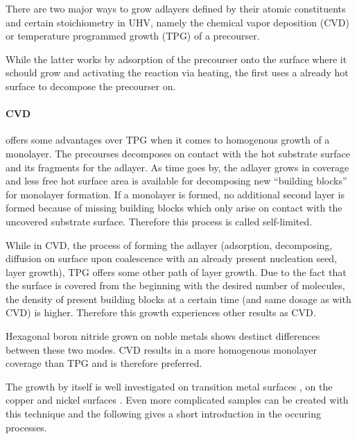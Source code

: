 There are two major ways to grow adlayers defined by their atomic constituents and certain stoichiometry in UHV, namely the chemical vapor deposition (CVD) or temperature programmed growth (TPG) of a precourser.

While the latter works by adsorption of the precourser onto the surface where it schould grow and activating the reaction via heating, the first uses a already hot surface to decompose the precourser on. 

\paragraph{CVD}offers some advantages over TPG when it comes to homogenous growth of a monolayer. The precourses decomposes on contact with the hot substrate surface and its fragments for the adlayer. As time goes by, the adlayer grows in coverage and less free hot surface area is available for decomposing new ``building blocks'' for monolayer formation. If a monolayer is formed, no additional second layer is formed because of missing building blocks which only arise on contact with the uncovered substrate surface. Therefore this process is called self-limited.

While in CVD, the process of forming the adlayer (adsorption, decomposing, diffusion on surface upon coalescence with an already present nucleation seed, layer growth), TPG offers some other path of layer growth. Due to the fact that the surface is covered from the beginning with the desired number of molecules, the density of present building blocks at a certain time (and same dosage as with CVD) is higher. Therefore this growth experiences other results as CVD.

Hexagonal boron nitride grown on noble metals shows destinct differences between these two modes. CVD results in a more homogenous monolayer coverage than TPG and is therefore preferred.

The growth by itself is well investigated on transition metal surfaces \cite{gomez_diaz_hexagonal_2013,morscher_formation_2006}, on the copper and nickel surfaces \cite{preobrajenski_monolayer_2005,joshi_boron_2012}. Even more complicated samples can be created with this technique \cite{roth_chemical_2013} and the following gives a short introduction in the occuring processes.


